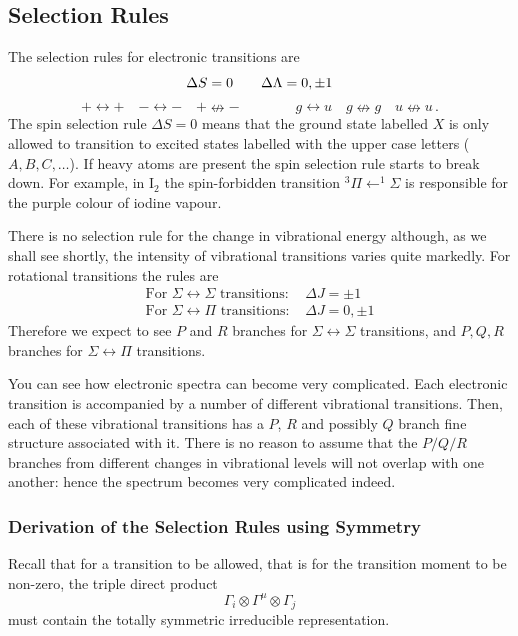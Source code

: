 \documentclass{article}
\theoremstyle{plain}\theoremheaderfont{\normalfont\itshape}\theorembodyfont{\rmfamily}\theoremseparator{.}\newtheorem*{rem}{Remark}\newtheorem*{ex}{Example}\newtheorem*{proof}{Proof}\newtheorem*{altp}{Alternative proof}
\theoremstyle{plain}\theoremheaderfont{\normalfont\bfseries}\theorembodyfont{\rmfamily}\theoremseparator{.}\newtheorem{thm}{Theorem}[section]\newtheorem{lem}[thm]{Lemma}\newtheorem{prop}[thm]{Proposition}\newtheorem*{cor}{Corollary}\newtheorem{defn}[thm]{Definition}\newtheorem{clm}[thm]{Claim}\newtheorem{clminproof}{Claim}\newtheorem{pos}{Postulate}[section]
\theoremstyle{break}\theoremheaderfont{\normalfont\itshape}\theorembodyfont{\rmfamily}\theoremseparator{.\medskip}\newtheorem*{proofskip}{Proof}\newtheorem*{exs}{Examples}\newtheorem*{rems}{Remarks}
\theoremstyle{break}\theoremheaderfont{\normalfont\bfseries}\theorembodyfont{\rmfamily}\theoremseparator{.\medskip}\newtheorem{lemskip}[thm]{Lemma}\newtheorem{defnskip}[thm]{Definition}\newtheorem{propskip}[thm]{Proposition}\newtheorem{thmskip}[thm]{Theorem}
\numberwithin{equation}{section}
\begin{document}
    \subsection{Selection Rules}
    The selection rules for electronic transitions are
    \begin{equation}
        \Delta S=0\qquad\Delta\Lambda=0,\pm 1\notag
    \end{equation}
    \begin{equation}
        +\leftrightarrow +\quad -\leftrightarrow -\quad +\nleftrightarrow - \qquad\qquad g\leftrightarrow u\quad g\nleftrightarrow g \quad u\nleftrightarrow u\,.
    \end{equation}
    The spin selection rule \(\Delta S=0\) means that the ground state labelled \(X\) is only allowed to transition to excited states labelled with the upper case letters (\(A,B,C,\dots\)). If heavy atoms are present the spin selection rule starts to break down. For example, in \(\mathrm{I_2}\) the spin-forbidden transition \(^3\Pi\leftarrow ^1\Sigma\) is responsible for the purple colour of iodine vapour.

    There is no selection rule for the change in vibrational energy although, as we shall see shortly, the intensity of vibrational transitions varies quite markedly. For rotational transitions the rules are
    \begin{align}
        \text{For \(\Sigma\leftrightarrow\Sigma\) transitions: }&\Delta J=\pm 1\\
        \text{For \(\Sigma\leftrightarrow\Pi\) transitions: }&\Delta J=0,\pm 1
    \end{align}
    Therefore we expect to see \(P\) and \(R\) branches for \(\Sigma\leftrightarrow\Sigma\) transitions, and \(P,Q,R\) branches for \(\Sigma\leftrightarrow\Pi\) transitions.

    You can see how electronic spectra can become very complicated. Each electronic transition is accompanied by a number of different vibrational transitions. Then, each of these vibrational transitions has a \(P\), \(R\) and possibly \(Q\) branch fine structure associated with it. There is no reason to assume that the \(P/Q/R\) branches from different changes in vibrational levels will not overlap with one another: hence the spectrum becomes very complicated indeed.

    \subsubsection{Derivation of the Selection Rules using Symmetry}
    Recall that for a transition to be allowed, that is for the transition moment to be non-zero, the triple direct product
    \begin{equation}
        \Gamma_i\otimes\Gamma^\mu\otimes\Gamma_j
    \end{equation}
    must contain the totally symmetric irreducible representation.
\end{document}
